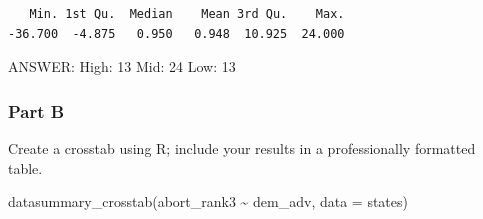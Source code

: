 \documentclass[
  letterpaper,
  DIV=11,
  numbers=noendperiod]{scrartcl}
\newenvironment{Shaded}{\begin{snugshade}}{\end{snugshade}}
\newcommand{\AttributeTok}[1]{\textcolor[rgb]{0.40,0.45,0.13}{#1}}
\newcommand{\DecValTok}[1]{\textcolor[rgb]{0.68,0.00,0.00}{#1}}
\newcommand{\FunctionTok}[1]{\textcolor[rgb]{0.28,0.35,0.67}{#1}}
\newcommand{\NormalTok}[1]{\textcolor[rgb]{0.00,0.23,0.31}{#1}}
\newcommand{\OtherTok}[1]{\textcolor[rgb]{0.00,0.23,0.31}{#1}}
\newcommand{\SpecialCharTok}[1]{\textcolor[rgb]{0.37,0.37,0.37}{#1}}
\newcommand{\StringTok}[1]{\textcolor[rgb]{0.13,0.47,0.30}{#1}}
\begin{document}
\begin{Shaded}
\end{Shaded}

\begin{verbatim}
   Min. 1st Qu.  Median    Mean 3rd Qu.    Max. 
-36.700  -4.875   0.950   0.948  10.925  24.000 
\end{verbatim}

ANSWER: High: 13 Mid: 24 Low: 13

\hypertarget{part-b}{%
\subsubsection{Part B}\label{part-b}}

Create a crosstab using R; include your results in a professionally
formatted table.

\begin{Shaded}
\begin{Highlighting}[]
\FunctionTok{datasummary\_crosstab}\NormalTok{(abort\_rank3 }\SpecialCharTok{\textasciitilde{}}\NormalTok{ dem\_adv, }\AttributeTok{data =}\NormalTok{ states)}
\end{Highlighting}
\end{Shaded}
\end{document}
